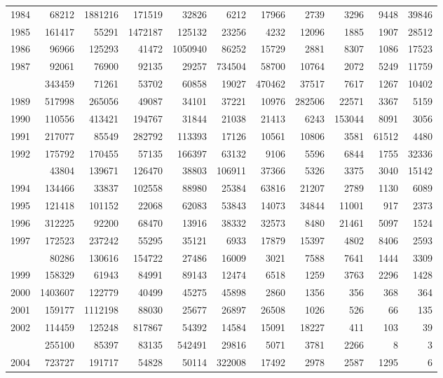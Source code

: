 \documentclass[
]{article}
\begin{document}
\begin{longtable}[t]{lrrrrrrrrrr}
1984 & 68212 & 1881216 & 171519 & 32826 & 6212 & 17966 & 2739 & 3296 & 9448 & 39846\\
1985 & 161417 & 55291 & 1472187 & 125132 & 23256 & 4232 & 12096 & 1885 & 1907 & 28512\\
1986 & 96966 & 125293 & 41472 & 1050940 & 86252 & 15729 & 2881 & 8307 & 1086 & 17523\\
1987 & 92061 & 76900 & 92135 & 29257 & 734504 & 58700 & 10764 & 2072 & 5249 & 11759\\
\addlinespace
1988 & 343459 & 71261 & 53702 & 60858 & 19027 & 470462 & 37517 & 7617 & 1267 & 10402\\
1989 & 517998 & 265056 & 49087 & 34101 & 37221 & 10976 & 282506 & 22571 & 3367 & 5159\\
1990 & 110556 & 413421 & 194767 & 31844 & 21038 & 21413 & 6243 & 153044 & 8091 & 3056\\
1991 & 217077 & 85549 & 282792 & 113393 & 17126 & 10561 & 10806 & 3581 & 61512 & 4480\\
1992 & 175792 & 170455 & 57135 & 166397 & 63132 & 9106 & 5596 & 6844 & 1755 & 32336\\
\addlinespace
1993 & 43804 & 139671 & 126470 & 38803 & 106911 & 37366 & 5326 & 3375 & 3040 & 15142\\
1994 & 134466 & 33837 & 102558 & 88980 & 25384 & 63816 & 21207 & 2789 & 1130 & 6089\\
1995 & 121418 & 101152 & 22068 & 62083 & 53843 & 14073 & 34844 & 11001 & 917 & 2373\\
1996 & 312225 & 92200 & 68470 & 13916 & 38332 & 32573 & 8480 & 21461 & 5097 & 1524\\
1997 & 172523 & 237242 & 55295 & 35121 & 6933 & 17879 & 15397 & 4802 & 8406 & 2593\\
\addlinespace
1998 & 80286 & 130616 & 154722 & 27486 & 16009 & 3021 & 7588 & 7641 & 1444 & 3309\\
1999 & 158329 & 61943 & 84991 & 89143 & 12474 & 6518 & 1259 & 3763 & 2296 & 1428\\
2000 & 1403607 & 122779 & 40499 & 45275 & 45898 & 2860 & 1356 & 356 & 368 & 364\\
2001 & 159177 & 1112198 & 88030 & 25677 & 26897 & 26508 & 1026 & 526 & 66 & 135\\
2002 & 114459 & 125248 & 817867 & 54392 & 14584 & 15091 & 18227 & 411 & 103 & 39\\
\addlinespace
2003 & 255100 & 85397 & 83135 & 542491 & 29816 & 5071 & 3781 & 2266 & 8 & 3\\
2004 & 723727 & 191717 & 54828 & 50114 & 322008 & 17492 & 2978 & 2587 & 1295 & 6\\

\end{longtable}
\end{document}
